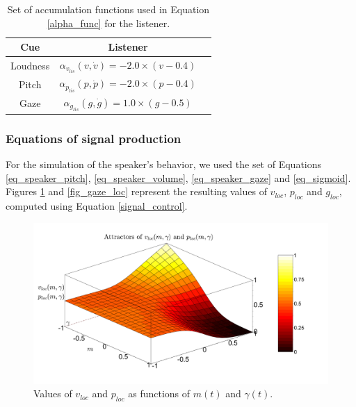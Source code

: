 \documentclass[twocolumn]{svjour3}
\begin{document}
\begin{table}
\centering
\begin{tabular}{|c|c|c|}
\hline
Cue & Listener \\
\hline
Loudness & $\alpha_{v_{lis}}(v,\dot{v})=-2.0\times (v-0.4)$ \\
\hline
Pitch & $\alpha_{p_{lis}}(p,\dot{p})=-2.0\times (p-0.4)$ \\
\hline
Gaze & $\alpha_{g_{lis}}(g,\dot{g})=1.0\times (g-0.5)$ \\
\hline
\end{tabular}
\caption{Set of accumulation functions used in Equation \ref{alpha_func} for the listener.}
\label{acc_functions_listener}
\end{table}

\subsubsection{Equations of signal production}

For the simulation of the speaker's behavior, we used the set of Equations \ref{eq_speaker_pitch}, \ref{eq_speaker_volume}, \ref{eq_speaker_gaze} and \ref{eq_sigmoid}. Figures \ref{fig_pro_loc} and \ref{fig_gaze_loc} represent the resulting values of $v_{loc}$, $p_{loc}$ and $g_{loc}$, computed using Equation \ref{signal_control}.

\begin{figure}
\centering
\includegraphics[width=\linewidth]{figure/bifurcProsodyLoc.pdf}
\caption{Values of $v_{loc}$ and $p_{loc}$ as functions of $m(t)$ and $\gamma(t)$.}
\label{fig_pro_loc}
\end{figure}
\end{document}
